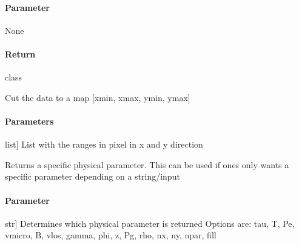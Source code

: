 \documentclass[letterpaper,10pt,english]{sphinxmanual}
\begin{document}
\begin{fulllineitems}
\begin{fulllineitems}
\paragraph{Parameter}
\label{\detokenize{classes:id1}}
\sphinxAtStartPar
None


\paragraph{Return}
\label{\detokenize{classes:return}}
\sphinxAtStartPar
class

\end{fulllineitems}


\begin{fulllineitems}
\label{\detokenize{classes:model.Model.cut_to_map}}
\pysigstartsignatures
{}
\pysigstopsignatures
\sphinxAtStartPar
Cut the data to a map {[}xmin, xmax, ymin, ymax{]}


\paragraph{Parameters}
\label{\detokenize{classes:parameters}}\begin{description}
\sphinxlineitem{Map}{[}list{]}
\sphinxAtStartPar
List with the ranges in pixel in x and y direction

\end{description}

\end{fulllineitems}


\begin{fulllineitems}
\label{\detokenize{classes:model.Model.get_attribute}}
\pysigstartsignatures
{}
\pysigstopsignatures
\sphinxAtStartPar
Returns a specific physical parameter. This can be used if ones only wants a specific
parameter depending on a string/input


\paragraph{Parameter}
\label{\detokenize{classes:id2}}\begin{description}
\sphinxlineitem{string}{[}str{]}
\sphinxAtStartPar
Determines which physical parameter is returned
Options are: tau, T, Pe, vmicro, B, vlos, gamma, phi, z, Pg, rho, nx, ny, npar, fill


\end{description}
\end{fulllineitems}
\end{fulllineitems}
\end{document}
